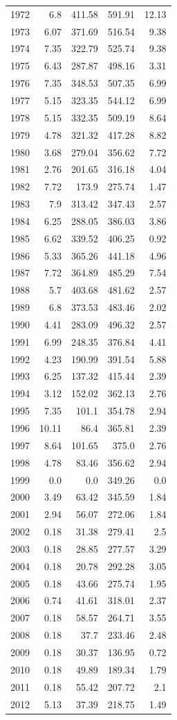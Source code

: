 \documentclass[a4paper]{article}
\begin{document}
\begin{longtable}{rrrrr}
1972 & 6.8 & 411.58 & 591.91 & 12.13\\
1973 & 6.07 & 371.69 & 516.54 & 9.38\\
1974 & 7.35 & 322.79 & 525.74 & 9.38\\
1975 & 6.43 & 287.87 & 498.16 & 3.31\\
1976 & 7.35 & 348.53 & 507.35 & 6.99\\
1977 & 5.15 & 323.35 & 544.12 & 6.99\\
1978 & 5.15 & 332.35 & 509.19 & 8.64\\
1979 & 4.78 & 321.32 & 417.28 & 8.82\\
1980 & 3.68 & 279.04 & 356.62 & 7.72\\
1981 & 2.76 & 201.65 & 316.18 & 4.04\\
1982 & 7.72 & 173.9 & 275.74 & 1.47\\
1983 & 7.9 & 313.42 & 347.43 & 2.57\\
1984 & 6.25 & 288.05 & 386.03 & 3.86\\
1985 & 6.62 & 339.52 & 406.25 & 0.92\\
1986 & 5.33 & 365.26 & 441.18 & 4.96\\
1987 & 7.72 & 364.89 & 485.29 & 7.54\\
1988 & 5.7 & 403.68 & 481.62 & 2.57\\
1989 & 6.8 & 373.53 & 483.46 & 2.02\\
1990 & 4.41 & 283.09 & 496.32 & 2.57\\
1991 & 6.99 & 248.35 & 376.84 & 4.41\\
1992 & 4.23 & 190.99 & 391.54 & 5.88\\
1993 & 6.25 & 137.32 & 415.44 & 2.39\\
1994 & 3.12 & 152.02 & 362.13 & 2.76\\
1995 & 7.35 & 101.1 & 354.78 & 2.94\\
1996 & 10.11 & 86.4 & 365.81 & 2.39\\
1997 & 8.64 & 101.65 & 375.0 & 2.76\\
1998 & 4.78 & 83.46 & 356.62 & 2.94\\
1999 & 0.0 & 0.0 & 349.26 & 0.0\\
2000 & 3.49 & 63.42 & 345.59 & 1.84\\
2001 & 2.94 & 56.07 & 272.06 & 1.84\\
2002 & 0.18 & 31.38 & 279.41 & 2.5\\
2003 & 0.18 & 28.85 & 277.57 & 3.29\\
2004 & 0.18 & 20.78 & 292.28 & 3.05\\
2005 & 0.18 & 43.66 & 275.74 & 1.95\\
2006 & 0.74 & 41.61 & 318.01 & 2.37\\
2007 & 0.18 & 58.57 & 264.71 & 3.55\\
2008 & 0.18 & 37.7 & 233.46 & 2.48\\
2009 & 0.18 & 30.37 & 136.95 & 0.72\\
2010 & 0.18 & 49.89 & 189.34 & 1.79\\
2011 & 0.18 & 55.42 & 207.72 & 2.1\\
2012 & 5.13 & 37.39 & 218.75 & 1.49\\
\end{longtable}
\end{document}
